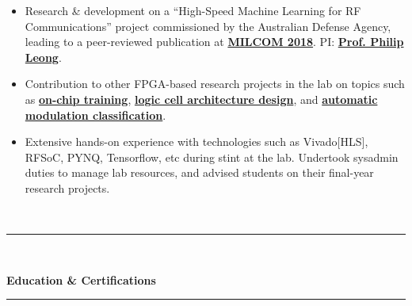 \documentclass[10pt]{article}
\newenvironment{myinnerlist}[1][\enskip\textbullet]%
        {\begin{itemize}[#1,leftmargin=*,parsep=0pt,itemsep=3pt,topsep=0pt,partopsep=0pt]}
        {\end{itemize}\vspace{.6\baselineskip}}
\begin{document}
{\begin{minipage}[t]{\textwidth+\marginparwidth+\marginparsep}
\begin{myinnerlist}
            \item Research \& development on a ``High-Speed Machine Learning
                for RF Communications'' project commissioned by the Australian
                Defense Agency, leading to a peer-reviewed publication at
                \href{https://ieeexplore.ieee.org/document/8599833}{\bf MILCOM
                2018}. PI:
                \href{https://www.sydney.edu.au/engineering/about/our-people/academic-staff/philip-leong.html}{\bf
                Prof. Philip Leong}.
            \item Contribution to other FPGA-based research projects in the lab on
                topics such as
                \href{https://ieeexplore.ieee.org/document/8742277}{\bf on-chip
                training},
                \href{https://dl.acm.org/doi/abs/10.1145/3373087.3375303}{\bf logic
                cell architecture design}, and
                \href{https://ieeexplore.ieee.org/abstract/document/9150443}{\bf automatic
                modulation classification}.
            \item Extensive hands-on experience with technologies such as
                Vivado[HLS], RFSoC, PYNQ, Tensorflow, etc during stint at the
                lab. Undertook sysadmin duties to manage lab resources, and
                advised students on their final-year research projects.

        \end{myinnerlist}
        \vspace{-0.15in}
    \end{minipage}
}\\[.15\baselineskip]

\newpage
{
    \hspace*{-\marginparsep minus \marginparwidth}%
    \begin{minipage}[t]{\textwidth+\marginparwidth+\marginparsep}%
         \rule{\columnwidth}{1pt}\\[-1.4\baselineskip]%
         \begin{center}{\large \bfseries Education \& Certifications}\end{center}
         \vspace{-0.18in}
         \rule{\columnwidth}{1pt}\\[-1.4\baselineskip]%
     \end{minipage}}\\[.5\baselineskip]
\end{document}
